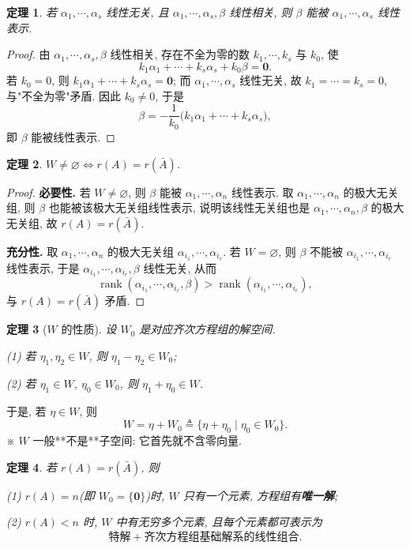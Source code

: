\documentclass[UTF8,11pt]{ctexart}
\theoremstyle{cnthm}
\newtheorem{thm}{定理}[section]
\begin{document}
\begin{thm}
若 $\alpha_1,\cdots,\alpha_s$ 线性无关, 且 $\alpha_1,\cdots,\alpha_s,\beta$ 线性相关, 则 $\beta$ 能被 $\alpha_1,\cdots,\alpha_s$ 线性表示.
\end{thm}

\begin{proof}
由 $\alpha_1,\cdots,\alpha_s,\beta$ 线性相关, 存在不全为零的数 $k_1,\cdots,k_s$ 与 $k_0$, 使
\[
k_1\alpha_1+\cdots+k_s\alpha_s+k_0\beta=\mathbf 0 .
\]
若 $k_0=0$, 则 $k_1\alpha_1+\cdots+k_s\alpha_s=\mathbf 0$; 而 $\alpha_1,\cdots,\alpha_s$ 线性无关, 故 $k_1=\cdots=k_s=0$, 与"不全为零"矛盾. 因此 $k_0\neq0$, 于是
\[
\beta=-\frac{1}{k_0}\bigl(k_1\alpha_1+\cdots+k_s\alpha_s\bigr),
\]
即 $\beta$ 能被线性表示.
\end{proof}

\begin{thm}
$W\neq\varnothing\iff r(A)=r(\bar A)$.
\end{thm}

\begin{proof}
\textbf{必要性.} 若 $W\neq\varnothing$, 则 $\beta$ 能被 $\alpha_1,\cdots,\alpha_n$ 线性表示. 取 $\alpha_1,\cdots,\alpha_n$ 的极大无关组, 则 $\beta$ 也能被该极大无关组线性表示, 说明该线性无关组也是 $\alpha_1,\cdots,\alpha_n,\beta$ 的极大无关组, 故 $r(A)=r(\bar A)$.

\textbf{充分性.} 取 $\alpha_1,\cdots,\alpha_n$ 的极大无关组 $\alpha_{i_1},\cdots,\alpha_{i_r}$. 若 $W=\varnothing$, 则 $\beta$ 不能被 $\alpha_{i_1},\cdots,\alpha_{i_r}$ 线性表示, 于是 $\alpha_{i_1},\cdots,\alpha_{i_r},\beta$ 线性无关, 从而
\[
\operatorname{rank}(\alpha_{i_1},\cdots,\alpha_{i_r},\beta)>\operatorname{rank}(\alpha_{i_1},\cdots,\alpha_{i_r}),
\]
与 $r(A)=r(\bar A)$ 矛盾.
\end{proof}

\begin{thm}[$W$ 的性质]
设 $W_0$ 是对应齐次方程组的解空间.

(1) 若 $\eta_1,\eta_2\in W$, 则 $\eta_1-\eta_2\in W_0$;

(2) 若 $\eta_1\in W$, $\eta_0\in W_0$, 则 $\eta_1+\eta_0\in W$.
\end{thm}

于是, 若 $\eta\in W$, 则
\[
W=\eta+W_0\triangleq\{\eta+\eta_0\mid \eta_0\in W_0\}.
\]
※ $W$ 一般**不是**子空间: 它首先就不含零向量.

\begin{thm}
若 $r(A)=r(\bar A)$, 则

(1) $r(A)=n$(即 $W_0=\{\mathbf 0\}$)时, $W$ 只有一个元素, 方程组有\textbf{唯一解};

(2) $r(A)<n$ 时, $W$ 中有无穷多个元素, 且每个元素都可表示为
\[
\text{特解}+\text{齐次方程组基础解系的线性组合}.
\]
\end{thm}
\end{document}
